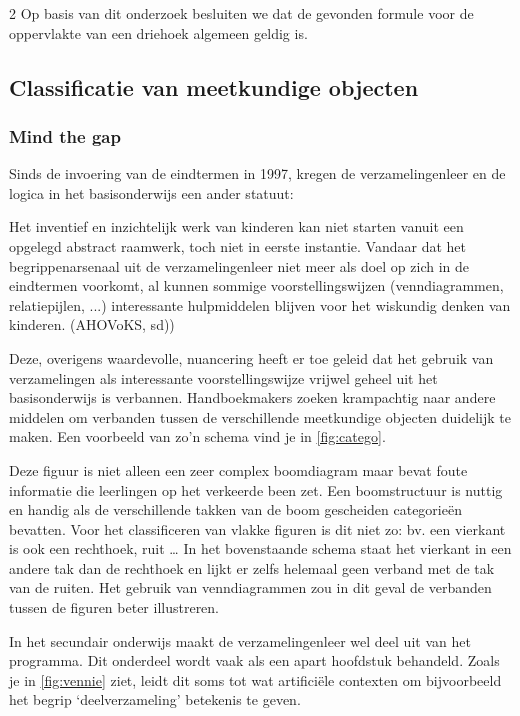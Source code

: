 \begin{multicols}{2}
Op basis van dit onderzoek besluiten we dat de gevonden formule voor de oppervlakte van een driehoek algemeen geldig is.

\subsection{Classificatie van meetkundige objecten}\label{classificatie-van-meetkundige-objecten}

\subsubsection*{Mind the gap}
Sinds de invoering van de eindtermen in 1997, kregen de verzamelingenleer en de logica in het basisonderwijs een ander statuut:

\begin{citaat}
Het inventief en inzichtelijk werk van kinderen kan niet starten vanuit een opgelegd abstract raamwerk, toch niet in eerste instantie.
Vandaar dat het begrippenarsenaal uit de verzamelingenleer niet meer als doel op zich in de eindtermen voorkomt, al kunnen sommige voorstellingswijzen (venndiagrammen, relatiepijlen, ...) interessante hulpmiddelen blijven voor het wiskundig denken van kinderen. (AHOVoKS, sd))
\end{citaat}

Deze, overigens waardevolle, nuancering heeft er toe geleid dat het gebruik van verzamelingen als interessante voorstellingswijze vrijwel geheel uit het basisonderwijs is verbannen.
Handboekmakers zoeken krampachtig naar andere middelen om verbanden tussen de verschillende meetkundige objecten duidelijk te maken.
Een voorbeeld van zo'n schema vind je in \autoref{fig:catego}.

Deze figuur is niet alleen een zeer complex boomdiagram maar bevat foute informatie die leerlingen op het verkeerde been zet.
Een boomstructuur is nuttig en handig als de verschillende takken van de boom gescheiden categorieën bevatten.
Voor het classificeren van vlakke figuren is dit niet zo: bv. een vierkant is ook een rechthoek, ruit
\ldots{}
In het bovenstaande schema staat het vierkant in een andere tak dan de rechthoek en lijkt er zelfs helemaal geen verband met de tak van de ruiten.
Het gebruik van venndiagrammen zou in dit geval de verbanden tussen de figuren beter illustreren.

In het secundair onderwijs maakt de verzamelingenleer wel deel uit van het programma.
Dit onderdeel wordt vaak als een apart hoofdstuk behandeld.
Zoals je in \autoref{fig:vennie} ziet, leidt dit soms tot wat artificiële contexten om bijvoorbeeld het begrip `deelverzameling' betekenis te geven.

\end{multicols}


